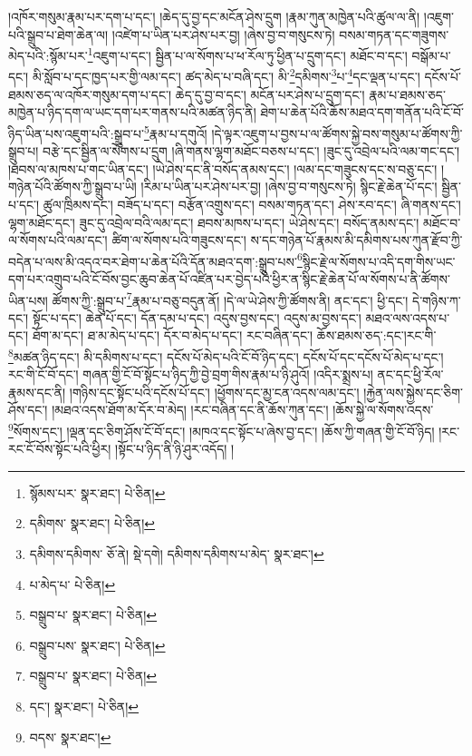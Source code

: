 །འཁོར་གསུམ་རྣམ་པར་དག་པ་དང་། །ཆེད་དུ་བྱ་དང་མངོན་ཤེས་དྲུག །རྣམ་ཀུན་མཁྱེན་པའི་ཚུལ་ལ་ནི། །འཇུག་པའི་སྒྲུབ་པ་ཐེག་ཆེན་ལ། །འཛེག་པ་ཡིན་པར་ཤེས་པར་བྱ། །ཞེས་བྱ་བ་གསུངས་ཏེ། བསམ་གཏན་དང་གཟུགས་མེད་པའི་:སྙོམ་པར་\footnote{སྙོམས་པར་  སྣར་ཐང་།  པེ་ཅིན། }འཇུག་པ་དང་། སྦྱིན་པ་ལ་སོགས་པ་ཕ་རོལ་ཏུ་ཕྱིན་པ་དྲུག་དང་། མཐོང་བ་དང་། བསྒོམ་པ་དང་། མི་སློབ་པ་དང་ཁྱད་པར་གྱི་ལམ་དང་། ཚད་མེད་པ་བཞི་དང་། མི་\footnote{དམིགས་  སྣར་ཐང་།  པེ་ཅིན། }དམིགས་\footnote{དམིགས་དམིགས་  ཅོ་ནེ།  སྡེ་དགེ། དམིགས་དམིགས་པ་མེད་  སྣར་ཐང་། }པ་\footnote{པ་མེད་པ་  པེ་ཅིན། }དང་ལྡན་པ་དང་། དངོས་པོ་ཐམས་ཅད་ལ་འཁོར་གསུམ་དག་པ་དང་། ཆེད་དུ་བྱ་བ་དང་། མངོན་པར་ཤེས་པ་དྲུག་དང་། རྣམ་པ་ཐམས་ཅད་མཁྱེན་པ་ཉིད་དག་ལ་ཡང་དག་པར་གནས་པའི་མཚན་ཉིད་ནི། ཐེག་པ་ཆེན་པོའི་ཆོས་མཐའ་དག་གནོན་པའི་ངོ་བོ་ཉིད་ཡིན་པས་འཇུག་པའི་:སྒྲུབ་པ་\footnote{བསྒྲུབ་པ་  སྣར་ཐང་།  པེ་ཅིན། }རྣམ་པ་དགུའོ། །དེ་ལྟར་འཇུག་པ་བྱས་པ་ལ་ཚོགས་སྐྱེ་བས་གསུམ་པ་ཚོགས་ཀྱི་སྒྲུབ་པ། བརྩེ་དང་སྦྱིན་ལ་སོགས་པ་དྲུག །ཞི་གནས་ལྷག་མཐོང་བཅས་པ་དང་། །ཟུང་དུ་འབྲེལ་པའི་ལམ་གང་དང་། །ཐབས་ལ་མཁས་པ་གང་ཡིན་དང་། །ཡེ་ཤེས་དང་ནི་བསོད་ནམས་དང་། །ལམ་དང་གཟུངས་དང་ས་བཅུ་དང་། །གཉེན་པོའི་ཚོགས་ཀྱི་སྒྲུབ་པ་ཡི། །རིམ་པ་ཡིན་པར་ཤེས་པར་བྱ། །ཞེས་བྱ་བ་གསུངས་ཏེ། སྙིང་རྗེ་ཆེན་པོ་དང་། སྦྱིན་པ་དང་། ཚུལ་ཁྲིམས་དང་། བཟོད་པ་དང་། བརྩོན་འགྲུས་དང་། བསམ་གཏན་དང་། ཤེས་རབ་དང་། ཞི་གནས་དང་། ལྷག་མཐོང་དང་། ཟུང་དུ་འབྲེལ་བའི་ལམ་དང་། ཐབས་མཁས་པ་དང་། ཡེ་ཤེས་དང་། བསོད་ནམས་དང་། མཐོང་བ་ལ་སོགས་པའི་ལམ་དང་། ཚིག་ལ་སོགས་པའི་གཟུངས་དང་། ས་དང་གཉེན་པོ་རྣམས་མི་དམིགས་པས་ཀུན་རྫོབ་ཀྱི་བདེན་པ་ལས་མི་འདའ་བར་ཐེག་པ་ཆེན་པོའི་དོན་མཐའ་དག་:སྒྲུབ་པས་\footnote{བསྒྲུབ་པས་  སྣར་ཐང་།  པེ་ཅིན། }སྙིང་རྗེ་ལ་སོགས་པ་འདི་དག་གིས་ཡང་དག་པར་འགྲུབ་པའི་ངོ་བོས་བྱང་ཆུབ་ཆེན་པོ་འཛིན་པར་བྱེད་པའི་ཕྱིར་ན་སྙིང་རྗེ་ཆེན་པོ་ལ་སོགས་པ་ནི་ཚོགས་ཡིན་པས། ཚོགས་ཀྱི་:སྒྲུབ་པ་\footnote{བསྒྲུབ་པ་  སྣར་ཐང་།  པེ་ཅིན། }རྣམ་པ་བཅུ་བདུན་ནོ། །དེ་ལ་ཡེ་ཤེས་ཀྱི་ཚོགས་ནི། ནང་དང་། ཕྱི་དང་། དེ་གཉིས་ཀ་དང་། སྟོང་པ་དང་། ཆེན་པོ་དང་། དོན་དམ་པ་དང་། འདུས་བྱས་དང་། འདུས་མ་བྱས་དང་། མཐའ་ལས་འདས་པ་དང་། ཐོག་མ་དང་། ཐ་མ་མེད་པ་དང་། དོར་བ་མེད་པ་དང་། རང་བཞིན་དང་། ཆོས་ཐམས་ཅད་:དང་།རང་གི་\footnote{དང་།  སྣར་ཐང་།  པེ་ཅིན། }མཚན་ཉིད་དང་། མི་དམིགས་པ་དང་། དངོས་པོ་མེད་པའི་ངོ་བོ་ཉིད་དང་། དངོས་པོ་དང་དངོས་པོ་མེད་པ་དང་། རང་གི་ངོ་བོ་དང་། གཞན་གྱི་ངོ་བོ་སྟོང་པ་ཉིད་ཀྱི་བྱེ་བྲག་གིས་རྣམ་པ་ཉི་ཤུའོ། །འདིར་སྨྲས་པ། ནང་དང་ཕྱི་རོལ་རྣམས་དང་ནི། །གཉིས་དང་སྟོང་པའི་དངོས་པོ་དང་། །ཕྱོགས་དང་མྱ་ངན་འདས་ལམ་དང་། །རྐྱེན་ལས་སྐྱེས་དང་ཅིག་ཤོས་དང་། །མཐའ་འདས་ཐོག་མ་དོར་བ་མེད། །རང་བཞིན་དང་ནི་ཆོས་ཀུན་དང་། །ཆོས་སྐྱེ་ལ་སོགས་འདས་\footnote{བདས་  སྣར་ཐང་། }སོགས་དང་། །ལྡན་དང་ཅིག་ཤོས་ངོ་བོ་དང་། །མཁའ་དང་སྟོང་པ་ཞེས་བྱ་དང་། །ཆོས་ཀྱི་གཞན་གྱི་ངོ་བོ་ཉིད། །རང་རང་ངོ་བོས་སྟོང་པའི་ཕྱིར། །སྟོང་པ་ཉིད་ནི་ཉི་ཤུར་འདོད། །
